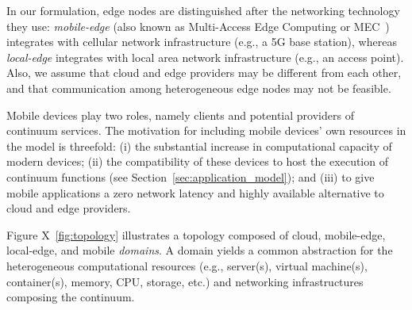 %
%

In our formulation, edge nodes are distinguished after the networking technology they use: \textit{mobile-edge} (also known as Multi-Access Edge Computing or MEC~\cite{ahmed2016isco}) integrates with cellular network infrastructure (e.g., a 5G base station), whereas \textit{local-edge} integrates with local area network infrastructure (e.g., an access point). Also, we assume that cloud and edge providers may be different from each other, and that communication among heterogeneous edge nodes may not be feasible.%




Mobile devices play two roles, namely clients and potential providers of continuum services. The motivation for including mobile devices' own resources in the model is threefold: (i) the substantial increase in computational capacity of modern devices; (ii) the compatibility of these devices to host the execution of continuum functions (see Section~\ref{sec:application_model}); and (iii) to give mobile applications a zero network latency and highly available alternative to cloud and edge providers. 

Figure X~\ref{fig:topology} illustrates a topology composed of cloud, mobile-edge, local-edge, and mobile \textit{domains}. 
A domain yields a common abstraction for the heterogeneous computational resources (e.g., server(s), virtual machine(s), container(s), memory, CPU, storage, etc.) and networking infrastructures composing the continuum. 




